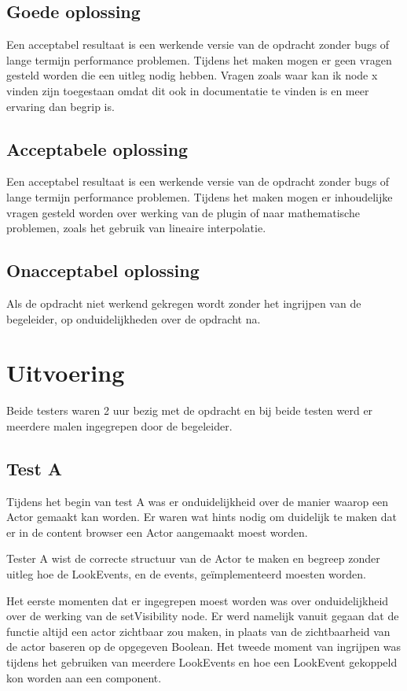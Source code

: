 \subsection*{Goede oplossing}
Een acceptabel resultaat is een werkende versie van de opdracht zonder bugs of lange termijn performance problemen. Tijdens het maken mogen er geen vragen gesteld worden die een uitleg nodig hebben. Vragen zoals waar kan ik node x vinden zijn toegestaan omdat dit ook in documentatie te vinden is en meer ervaring dan begrip is. 

\subsection*{Acceptabele oplossing}
Een acceptabel resultaat is een werkende versie van de opdracht zonder bugs of lange termijn performance problemen. Tijdens het maken mogen er inhoudelijke vragen gesteld worden over werking van de plugin of naar mathematische problemen, zoals het gebruik van lineaire interpolatie.

\subsection*{Onacceptabel oplossing}
Als de opdracht niet werkend gekregen wordt zonder het ingrijpen van de begeleider, op onduidelijkheden over de opdracht na.  

\section{Uitvoering}
Beide testers waren 2 uur bezig met de opdracht en bij beide testen werd er meerdere malen ingegrepen door de begeleider.

\subsection*{Test A}
Tijdens het begin van test A was er onduidelijkheid over de manier waarop een Actor gemaakt kan worden. Er waren wat hints nodig om duidelijk te maken dat er in de content browser een Actor aangemaakt moest worden.

Tester A wist de correcte structuur van de Actor te maken en begreep zonder uitleg hoe de LookEvents, en de events, geïmplementeerd moesten worden. 

Het eerste momenten dat er ingegrepen moest worden was over onduidelijkheid over de werking van de setVisibility node. Er werd namelijk vanuit gegaan dat de functie altijd een actor zichtbaar zou maken, in plaats van de zichtbaarheid van de actor baseren op de opgegeven Boolean. Het tweede moment van ingrijpen was tijdens het gebruiken van meerdere LookEvents en hoe een LookEvent gekoppeld kon worden aan een component. 

